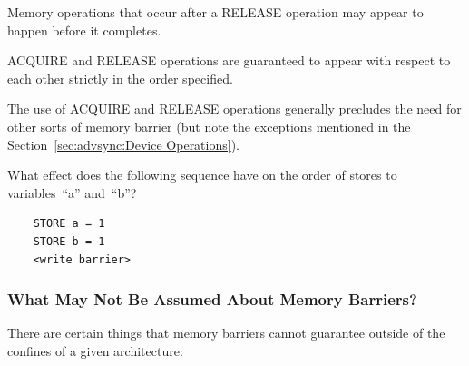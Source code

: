 Memory operations that occur after a RELEASE operation may appear to
happen before it completes.

ACQUIRE and RELEASE operations are guaranteed to appear with respect to each
other strictly in the order specified.

The use of ACQUIRE and RELEASE operations generally precludes the need for
other sorts of memory barrier (but note the exceptions mentioned in the
Section~\ref{sec:advsync:Device Operations}).

\QuickQuiz{}
	What effect does the following sequence have on the
	order of stores to variables~``a'' and~``b''?

	\vspace{5pt}
	\begin{minipage}[t]{\columnwidth}
	\small
	\begin{verbatim}
	STORE a = 1
	STORE b = 1
	<write barrier>
	\end{verbatim}
	\end{minipage}
 \QuickQuizEnd

\subsubsection{What May Not Be Assumed About Memory Barriers?}
\label{sec:advsync:What May Not Be Assumed About Memory Barriers?}

There are certain things that memory barriers cannot guarantee outside
of the confines of a given architecture:

